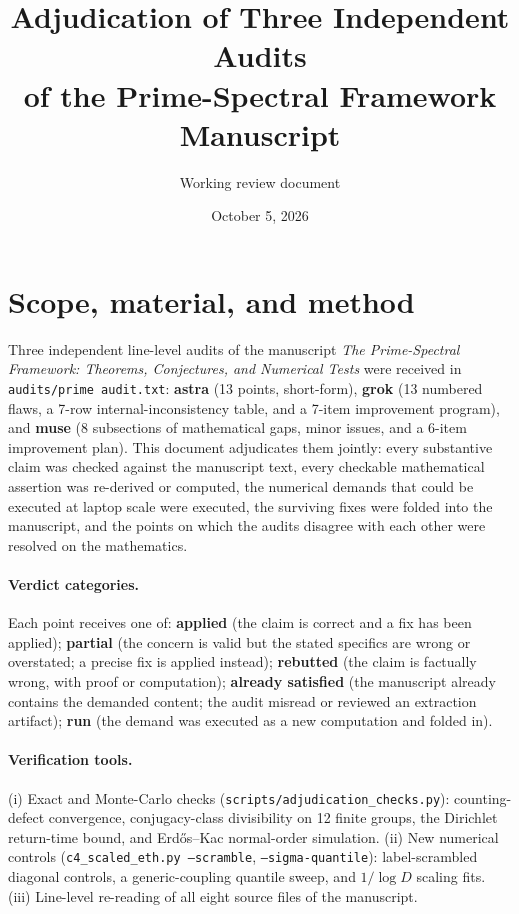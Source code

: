 \documentclass[11pt,a4paper]{article}
\title{Adjudication of Three Independent Audits\\ of the Prime-Spectral Framework Manuscript}
\author{Working review document}
\date{October 5, 2026}
\newcommand{\ok}{\textbf{applied}}
\newcommand{\reb}{\textbf{rebutted}}
\newcommand{\pver}{\textbf{partial}}
\newcommand{\sat}{\textbf{already satisfied}}
\begin{document}
\maketitle

\section{Scope, material, and method}

Three independent line-level audits of the manuscript \emph{The Prime-Spectral
Framework: Theorems, Conjectures, and Numerical Tests} were received in
\texttt{audits/prime audit.txt}: \textbf{astra} (13 points, short-form),
\textbf{grok} (13 numbered flaws, a 7-row internal-inconsistency table, and a
7-item improvement program), and \textbf{muse} (8 subsections of mathematical
gaps, minor issues, and a 6-item improvement plan). This document adjudicates
them jointly: every substantive claim was checked against the manuscript text,
every checkable mathematical assertion was re-derived or computed, the
numerical demands that could be executed at laptop scale were executed, the
surviving fixes were folded into the manuscript, and the points on which the
audits disagree with each other were resolved on the mathematics.

\paragraph{Verdict categories.} Each point receives one of:
\ok{} (the claim is correct and a fix has been applied);
\pver{} (the concern is valid but the stated specifics are wrong or
overstated; a precise fix is applied instead);
\reb{} (the claim is factually wrong, with proof or computation);
\sat{} (the manuscript already contains the demanded content; the audit
misread or reviewed an extraction artifact);
\textbf{run} (the demand was executed as a new computation and folded in).

\paragraph{Verification tools.} (i) Exact and Monte-Carlo checks
(\texttt{scripts/adjudication\_checks.py}): counting-defect convergence,
conjugacy-class divisibility on 12 finite groups, the Dirichlet return-time
bound, and Erd\H{o}s--Kac normal-order simulation. (ii) New numerical controls
(\texttt{c4\_scaled\_eth.py --scramble}, \texttt{--sigma-quantile}):
label-scrambled diagonal controls, a generic-coupling quantile sweep, and
$1/\log D$ scaling fits. (iii) Line-level re-reading of all eight source
files of the manuscript.
\end{document}
